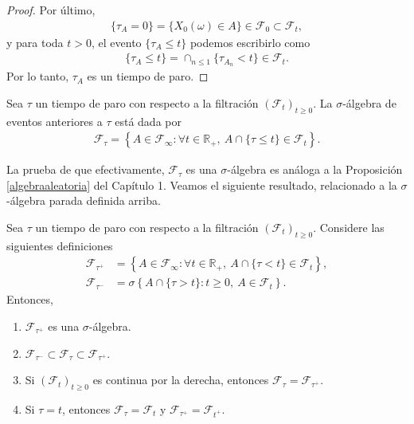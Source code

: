 \begin{proof}
Por último, 
\begin{align*}
	\{ \tau_A = 0 \} = \{ X_0 (\omega) \in A \} \in \mathcal{F}_0 \subset \mathcal{F}_t, 
\end{align*}
y para toda $t > 0$, el evento $\{ \tau_A \leq t \}$ podemos escribirlo como
\begin{align*}
	\{ \tau_A \leq t \} = \cap_{n \leq 1} \{ \tau_{A_n} < t \} \in \mathcal{F}_t.
\end{align*}
Por lo tanto, $\tau_A$ es un tiempo de paro.
\end{proof}

\begin{definition}
	Sea $\tau$ un tiempo de paro con respecto a la filtración $(\mathcal{F}_t)_{t \geq 0}$. La $\sigma$-álgebra de eventos anteriores a $\tau$ está dada por 
	\begin{align*}
	\mathcal{F}_{\tau} = \left\{ A \in \mathcal{F}_{\infty} : \forall t \in \mathbb{R}_{+}, \ A \cap \{\tau \leq t\} \in \mathcal{F}_t \right\}.
	\end{align*}
\end{definition}
La prueba de que efectivamente, $\mathcal{F}_{\tau}$ es una $\sigma$-álgebra es análoga a la Proposición \ref{algebraaleatoria} del Capítulo 1. Veamos el siguiente resultado, relacionado a la $\sigma$-álgebra parada definida arriba.
\begin{proposition}
	Sea $\tau$ un tiempo de paro con respecto a la filtración $(\mathcal{F}_t)_{t \geq0}$. Considere las siguientes definiciones
	\begin{align*}
		\mathcal{F}_{\tau^{+}} & = \left\{ A \in \mathcal{F}_{\infty} : \forall t \in \mathbb{R}_{+}, \ A \cap \{\tau < t\} \in \mathcal{F}_t \right\}, \\
		\mathcal{F}_{\tau^{-}} & = \sigma \left\{ A \cap \{\tau > t\} : t \geq 0, \ A \in \mathcal{F}_t \right\}.
	\end{align*}
	Entonces, 
	\begin{enumerate}
		\item $\mathcal{F}_{\tau^{+}}$ es una $\sigma$-álgebra.
		\item $\mathcal{F}_{\tau^{-}} \subset \mathcal{F}_{\tau} \subset \mathcal{F}_{\tau^{+}}$.
		\item Si $(\mathcal{F}_t)_{t \geq 0}$ es continua por la derecha, entonces $\mathcal{F}_{\tau} = \mathcal{F}_{\tau^{+}}$.
		\item Si $\tau = t$, entonces $\mathcal{F}_{\tau} = \mathcal{F}_t$ y $\mathcal{F}_{\tau^{+}} = \mathcal{F}_{t^{+}}$.
	\end{enumerate}
	\end{proposition}
